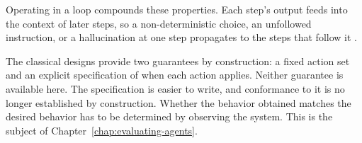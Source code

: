 Operating in a loop compounds these properties. Each step's output feeds into the context of later steps, so a non-deterministic choice, an unfollowed instruction, or a hallucination at one step propagates to the steps that follow it \cite{wangSurveyLargeLanguage2024}.

The classical designs provide two guarantees by construction: a fixed action set and an explicit specification of when each action applies. Neither guarantee is available here. The specification is easier to write, and conformance to it is no longer established by construction. Whether the behavior obtained matches the desired behavior has to be determined by observing the system. This is the subject of Chapter~\ref{chap:evaluating-agents}.
